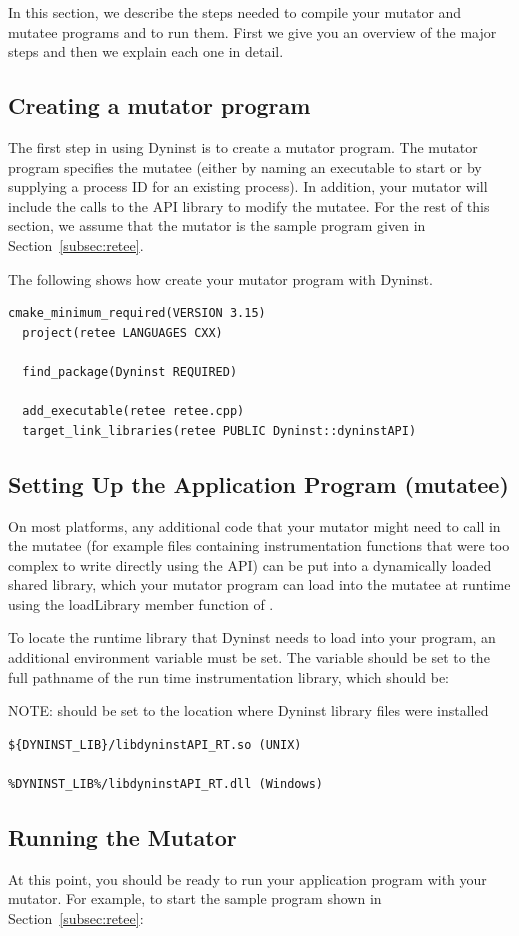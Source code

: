 In this section, we describe the steps needed to compile your mutator and mutatee programs and to run
them. First we give you an overview of the major steps and then we explain each one in detail.

\subsection{Creating a mutator program}

The first step in using Dyninst is to create a mutator program. The mutator program specifies the
mutatee (either by naming an executable to start or by supplying a process ID for an existing
process). In addition, your mutator will include the calls to the API library to modify the mutatee.
For the rest of this section, we assume that the mutator is the sample program given in
Section~\ref{subsec:retee}.

The following  shows how create your mutator program with Dyninst.

\begin{lstlisting}[language={}]
  cmake_minimum_required(VERSION 3.15)
  project(retee LANGUAGES CXX)

  find_package(Dyninst REQUIRED)

  add_executable(retee retee.cpp)
  target_link_libraries(retee PUBLIC Dyninst::dyninstAPI)
\end{lstlisting}

\subsection{Setting Up the Application Program (mutatee)}

On most platforms, any additional code that your mutator might need to call in the mutatee (for example
files containing instrumentation functions that were too complex to write directly using the API) can
be put into a dynamically loaded shared library, which your mutator program can load into the mutatee
at runtime using the loadLibrary member function of .

To locate the runtime library that Dyninst needs to load into your program, an additional environment
variable must be set. The variable  should be set to the full pathname of the
run time instrumentation library, which should be:


NOTE:  should be set to the location where Dyninst library files were installed

\begin{lstlisting}[language={}]
${DYNINST_LIB}/libdyninstAPI_RT.so (UNIX)

%DYNINST_LIB%/libdyninstAPI_RT.dll (Windows)
\end{lstlisting}

\subsection{Running the Mutator}

At this point, you should be ready to run your application program with your mutator. For example,
to start the sample program shown in Section~\ref{subsec:retee}:

